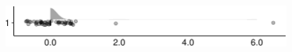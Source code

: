 \documentclass[
]{article}
\begin{document}
\begin{minipage}[t]{0.3\linewidth}

~

\end{minipage}%
\begin{minipage}[t]{0.7\linewidth}

\includegraphics[width=396px]{codebook_template_files/figure-latex/q7_39_rainplot-1}

\end{minipage}
 \vspace*{-5mm} 

\begin{minipage}[t]{0.3\linewidth}

~

\end{minipage}%
\begin{minipage}[t]{0.7\linewidth}

~

\end{minipage}
 \vspace*{-7mm} 
\end{document}
